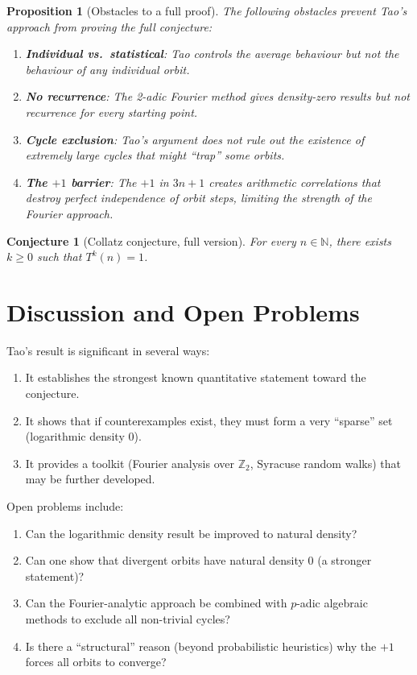 \documentclass[12pt,a4paper]{article}
\newtheorem{proposition}[theorem]{Proposition}
\newtheorem{conjecture}[theorem]{Conjecture}
\begin{document}
\begin{proposition}[Obstacles to a full proof]\label{prop:obstacles}
The following obstacles prevent Tao's approach from proving the full conjecture:
\begin{enumerate}
  \item \textbf{Individual vs.\ statistical}: Tao controls the average behaviour but not
        the behaviour of any individual orbit.
  \item \textbf{No recurrence}: The 2-adic Fourier method gives density-zero results but
        not recurrence for every starting point.
  \item \textbf{Cycle exclusion}: Tao's argument does not rule out the existence of
        extremely large cycles that might ``trap'' some orbits.
  \item \textbf{The $+1$ barrier}: The $+1$ in $3n+1$ creates arithmetic correlations
        that destroy perfect independence of orbit steps, limiting the strength of the
        Fourier approach.
\end{enumerate}
\end{proposition}

\begin{conjecture}[Collatz conjecture, full version]\label{conj:full}
For every $n \in \mathbb{N}$, there exists $k \geq 0$ such that $T^k(n) = 1$.
\end{conjecture}

\section{Discussion and Open Problems}

Tao's result is significant in several ways:
\begin{enumerate}
  \item It establishes the strongest known quantitative statement toward the conjecture.
  \item It shows that if counterexamples exist, they must form a very ``sparse'' set
        (logarithmic density 0).
  \item It provides a toolkit (Fourier analysis over $\mathbb{Z}_2$, Syracuse random walks)
        that may be further developed.
\end{enumerate}

Open problems include:
\begin{enumerate}
  \item Can the logarithmic density result be improved to natural density?
  \item Can one show that divergent orbits have natural density 0 (a stronger statement)?
  \item Can the Fourier-analytic approach be combined with $p$-adic algebraic methods
        to exclude all non-trivial cycles?
  \item Is there a ``structural'' reason (beyond probabilistic heuristics) why the
        $+1$ forces all orbits to converge?
\end{enumerate}
\end{document}
